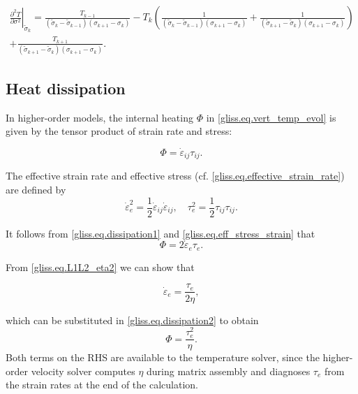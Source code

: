 \begin{multline}
    \label{gliss.eq.temp_d3}
          {{\left. \frac{{{\partial }^{2}}T}{\partial {{\sigma }^{2}}} \right|}_{{{{\tilde{\sigma }}}_{k}}}} =
          \frac{{{T}_{k-1}}}{\left( {{{\tilde{\sigma }}}_{k}}-{{{\tilde{\sigma }}}_{k-1}} \right)\left( {{\sigma }_{k+1}}-{{\sigma }_{k}} \right)}
          - {{T}_{k}}\left( \frac{1}{\left( {{{\tilde{\sigma }}}_{k}}-{{{\tilde{\sigma }}}_{k-1}} \right)\left( {{\sigma }_{k+1}}-{{\sigma }_{k}} \right)}+\frac{1}{\left( {{{\tilde{\sigma }}}_{k+1}}-{{{\tilde{\sigma }}}_{k}} \right)\left( {{\sigma }_{k+1}}-{{\sigma }_{k}} \right)} \right)\\
          +\frac{{{T}_{k+1}}}{\left( {{{\tilde{\sigma }}}_{k+1}}-{{{\tilde{\sigma }}}_{k}} \right)\left( {{\sigma }_{k+1}}-{{\sigma }_{k}} \right)}.
\end{multline}
%
\subsection{Heat dissipation}

In higher-order models, the internal heating $\Phi$ in \eqref{gliss.eq.vert_temp_evol} 
is given by the tensor product of strain rate and stress:

\begin{equation}
  \label{gliss.eq.dissipation1}
  \Phi ={\dot{{\varepsilon} }_{ij}}{{\tau }_{ij}}.
\end{equation}

\noindent
The effective strain rate and effective stress (cf. \eqref{gliss.eq.effective_strain_rate})
are defined by
\begin{equation}
  \label{gliss.eq.eff_stress_strain}
   \dot{{\varepsilon}}_{e}^{2}=\frac{1}{2}{\dot{{\varepsilon} }_{ij}}{\dot{{\varepsilon} }_{ij}}, \quad {\tau}_{e}^{2}=\frac{1}{2} {{\tau }_{ij}}{{\tau }_{ij}}.
\end{equation}

\noindent
It follows from \eqref{gliss.eq.dissipation1} and \eqref{gliss.eq.eff_stress_strain} that
\begin{equation}
  \label{gliss.eq.dissipation2}
  \Phi = 2 {\dot{{\varepsilon} }_e}{{\tau }_e}.
\end{equation}

\noindent
From \eqref{gliss.eq.L1L2_eta2} we can show that

\begin{equation}
  \dot{\varepsilon}_e = \frac{\tau_e}{2 \eta}, 
\end{equation}

\noindent
which can be substituted in \eqref{gliss.eq.dissipation2} to obtain
\begin{equation}
  \label{gliss.eq.dissipation3}
  \Phi = \frac{\tau_e^2}{\eta}.
\end{equation}
%
Both terms on the RHS are available to the temperature solver, since the 
higher-order velocity solver computes $\eta$ during matrix assembly
and diagnoses $\tau_e$ from the strain rates at the end of the calculation.
